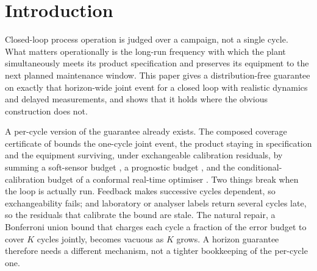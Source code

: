 \documentclass[review,12pt]{elsarticle}
\begin{document}
\section{Introduction}
\label{sec:intro}

Closed-loop process operation is judged over a campaign, not a single cycle. What matters
operationally is the long-run frequency with which the plant simultaneously meets its product
specification and preserves its equipment to the next planned maintenance window. This paper
gives a distribution-free guarantee on exactly that horizon-wide joint event for a closed loop
with realistic dynamics and delayed measurements, and shows that it holds where the obvious
construction does not.

A per-cycle version of the guarantee already exists. The composed coverage certificate of
\citet{busico_m4} bounds the one-cycle joint event, the product staying in specification and
the equipment surviving, under exchangeable calibration residuals, by summing a soft-sensor
budget \citep{busico_m1}, a prognostic budget \citep{busico_m2}, and the conditional-calibration
budget of a conformal real-time optimiser \citep{busico_m3}. Two things break when the loop is
actually run. Feedback makes successive cycles dependent, so exchangeability fails; and
laboratory or analyser labels return several cycles late, so the residuals that calibrate the
bound are stale. The natural repair, a Bonferroni union bound that charges each cycle a fraction
of the error budget to cover $K$ cycles jointly, becomes vacuous as $K$ grows. A horizon
guarantee therefore needs a different mechanism, not a tighter bookkeeping of the per-cycle one.
\end{document}

